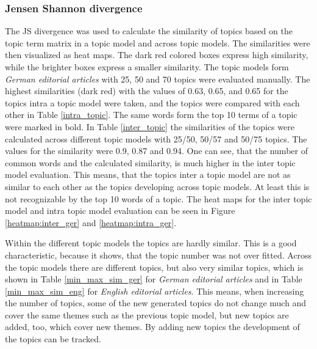\subsubsection{Jensen Shannon divergence}
The \ac{JS} divergence was used to calculate the similarity of topics based on the topic term matrix in a topic model and across topic models. The similarities were then visualized as heat maps. The dark red colored boxes express high similarity, while the brighter boxes express a smaller similarity.  
The topic models form \textit{German editorial articles} with 25, 50 and 70 topics were evaluated manually. The highest similarities (dark red) with the values of 0.63, 0.65, and 0.65 for the topics intra a topic model were taken, and the topics were compared with each other in Table \ref{intra_topic}. The same words form the top 10 terms of a topic were marked in bold. In Table \ref{inter_topic} the similarities of the topics were calculated across different topic models with 25/50, 50/57 and 50/75 topics. The values for the similarity were 0.9, 0.87 and 0.94. One can see, that the number of common words and the calculated similarity, is much higher in the inter topic model evaluation. This means, that the topics inter a topic model are not as similar to each other as the topics developing across topic models. At least this is not recognizable by the top 10 words of a topic. The heat maps for the inter topic model and intra topic model evaluation can be seen in Figure \ref{heatmap:inter_ger} and \ref{heatmap:intra_ger}.

Within the different topic models the topics are hardly similar. This is a good characteristic, because it shows, that the topic number was not over fitted. Across the topic models there are different topics, but also very similar topics, which is shown in Table \ref{min_max_sim_ger} for \textit{German editorial articles} and in Table \ref{min_max_sim_eng} for \textit{English editorial articles}. This means, when increasing the number of topics, some of the new generated topics do not change much and cover the same themes such as the previous topic model, but new topics are added, too, which cover new themes. By adding new topics the development of the topics can be tracked. 


